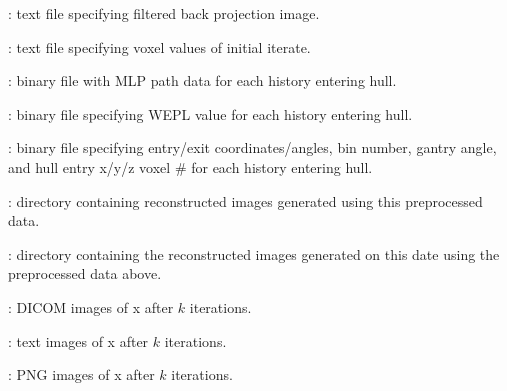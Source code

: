 \documentclass[landscape,12pt]{article}
\begin{document}
\begin{myEnumerate}[labelindent=1pt, leftmargin=*]
\begin{myEnumerate}[labelindent=1pt, leftmargin=*]
\begin{myEnumerate}[labelindent=1pt, leftmargin=*]
\begin{myEnumerate}[labelindent=1pt, leftmargin=*]
\begin{myEnumerate}[labelindent=1pt, leftmargin=*]
\begin{myEnumerate}[labelindent=1pt, leftmargin=*]
\begin{myEnumerate}[labelindent=1pt, leftmargin=*]
\begin{myEnumerate}[labelindent=1pt, leftmargin=*]
\begin{myEnumerate}[labelindent=1pt, leftmargin=*]
                                        \item {} \color{Black}: text file specifying filtered back projection image.
                                        \item {} \color{Black}: text file specifying voxel values of initial iterate.
                                        \item {} \color{Black}: binary file with MLP path data for each history entering hull.
                                        \item {} \color{Black}: binary file specifying WEPL value for each history entering hull.
                                        \item {} \color{Black}: binary file specifying entry/exit coordinates/angles, bin number, gantry angle, and hull entry x/y/z voxel \# for each history entering hull.
                                        \item {} \color{Black}: directory containing reconstructed images generated using this preprocessed data.
                                        \begin{myEnumerate}[labelindent=1pt, leftmargin=*]
                                            \item {} \color{Black}: directory containing the reconstructed images generated on this date using the preprocessed data above.
                                                \begin{myEnumerate}[labelindent=1pt, leftmargin=*]
                                                    \item {} \color{Black}: DICOM images of x after $k$ iterations.
                                                    \item {} \color{Black}: text images of x after $k$ iterations.
                                                    \item {} \color{Black}: PNG images of x after $k$ iterations.
                                                \end{myEnumerate}
                                        \end{myEnumerate}

\end{myEnumerate}
\end{myEnumerate}
\end{myEnumerate}
\end{myEnumerate}
\end{myEnumerate}
\end{myEnumerate}
\end{myEnumerate}
\end{myEnumerate}
\end{myEnumerate}
\end{document}
